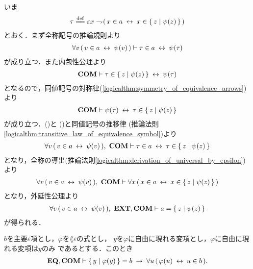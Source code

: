 	\begin{sketch}
		いま
		\begin{align}
			\tau \defeq 
			\varepsilon x \negation (\, x \in a \lrarrow x \in \Set{z}{\psi(z)}\, )
		\end{align}
		とおく．まず全称記号の推論規則より
		\begin{align}
			\forall v\, (\, v \in a \hspace{0.25em}\leftrightarrow\hspace{0.25em} \psi(v)\, )
			\vdash \tau \in a \hspace{0.25em}\leftrightarrow\hspace{0.25em} \psi(\tau)
			\label{fom:equivalent_formula_rewriting_2_1}
		\end{align}
		が成り立つ．また内包性公理より
		\begin{align}
			\mbox{\bf COM} \vdash \tau \in \left\{\, z \mid \psi(z)\, \right\} \hspace{0.25em}\leftrightarrow\hspace{0.25em} \psi(\tau)
		\end{align}
		となるので，同値記号の対称律(\ref{logicalthm:symmetry_of_equivalence_arrows})より
		\begin{align}
			\mbox{\bf COM} \vdash \psi(\tau) \hspace{0.25em}\leftrightarrow\hspace{0.25em} \tau \in \left\{\, z \mid \psi(z)\, \right\}
			\label{fom:equivalent_formula_rewriting_2_2}
		\end{align}
		が成り立つ．()と
		()と同値記号の推移律
		(推論法則\ref{logicalthm:transitive_law_of_equivalence_symbol})より
		\begin{align}
			\forall v\, (\, v \in a \hspace{0.25em}\leftrightarrow\hspace{0.25em} \psi(v)\, ),\ \mbox{\bf COM} \vdash
			\tau \in a \hspace{0.25em}\leftrightarrow\hspace{0.25em} \tau \in \left\{\, z \mid \psi(z)\, \right\}
		\end{align}
		となり，全称の導出(推論法則\ref{logicalthm:derivation_of_universal_by_epsilon})より
		\begin{align}
			\forall v\, (\, v \in a \hspace{0.25em}\leftrightarrow\hspace{0.25em} \psi(v)\, ),\ \mbox{\bf COM} \vdash
			\forall x\, (\, x \in a \hspace{0.25em}\leftrightarrow\hspace{0.25em} x \in \left\{\, z \mid \psi(z)\, \right\}\, )
		\end{align}
		となり，外延性公理より
		\begin{align}
			\forall v\, (\, v \in a \hspace{0.25em}\leftrightarrow\hspace{0.25em} \psi(v)\, ),\ \mbox{{\bf EXT}},\mbox{\bf COM} \vdash
			a = \left\{\, z \mid \psi(z)\, \right\}
		\end{align}
		が得られる．
		\QED
	\end{sketch}
	
	\begin{screen}
		\begin{thm}
		\label{thm:equivalent_formula_rewriting_3}
			$b$を主要$\varepsilon$項とし，$\varphi$を$\lang{\varepsilon}$の式とし，
			$y$を$\varphi$に自由に現れる変項とし，$\varphi$に自由に現れる変項は$y$のみ
			であるとする．このとき
			\begin{align}
				\mbox{{\bf EQ}},\mbox{\bf COM} \vdash \left\{\, y \mid \varphi(y)\, \right\} = b 
				\hspace{0.25em}\rightarrow\hspace{0.25em} \forall u\, (\, \varphi(u) \hspace{0.25em}\leftrightarrow\hspace{0.25em} u \in b\, ).
			\end{align}
		\end{thm}
	\end{screen}
	
